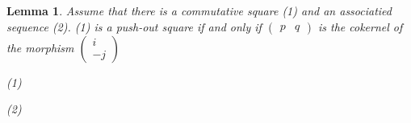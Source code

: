 \documentclass[11pt]{article}
\newtheorem{lemma}[theorem]{Lemma}
\theoremstyle{definition}
\theoremstyle{remark}
\begin{document}
            \begin{lemma}
                Assume that there is a commutative square (1) and an associatied sequence (2). (1) is a push-out square if and only if $\begin{pmatrix}
                    p & q
                \end{pmatrix}$ is the cokernel of the morphism $\begin{pmatrix}
                    i \\ -j
                \end{pmatrix}$
                \begin{center}
                    (1)
                    \space (2)
                \end{center}
            \end{lemma}
\end{document}
